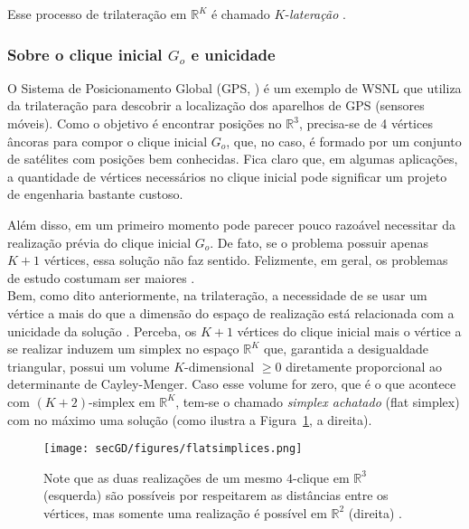 Esse processo de trilateração em $\mathbb{R}^K$ é chamado $K$-\textit{lateração} \cite{eren2004rigidity, libertiEDG}.

\subsubsection{Sobre o clique inicial $G_o$ e unicidade \label{sec:go}}
O Sistema de Posicionamento Global (GPS,  \cite{gps}) é um exemplo de WSNL que utiliza da trilateração para descobrir a localização dos aparelhos de GPS (sensores móveis). Como o objetivo é encontrar posições no $\mathbb{R}^3$, precisa-se de 4 vértices âncoras para compor o clique inicial $G_o$, que, no caso, é formado por um conjunto de satélites com posições bem conhecidas. Fica claro que, em algumas aplicações, a quantidade de vértices necessários no clique inicial pode significar um projeto de engenharia bastante custoso.

Além disso, em um primeiro momento pode parecer pouco razoável necessitar da realização prévia do clique inicial $G_o$. De fato, se o problema possuir apenas $K+1$ vértices, essa solução não faz sentido. Felizmente, em geral, os problemas de estudo costumam ser maiores \cite{carlileGDandAplications}. 
\\

Bem, como dito anteriormente, na trilateração, a necessidade de se usar um vértice a mais do que a dimensão do espaço de realização está relacionada com a unicidade da solução \cite{hendrickson1992conditions, connelly1991generic}. Perceba, os $K+1$ vértices do clique inicial mais o vértice a se realizar induzem um simplex no espaço $\mathbb{R}^K$ que, garantida a desigualdade triangular, possui um volume $K$-dimensional $\geq 0$ diretamente proporcional ao determinante de Cayley-Menger. Caso esse volume for zero, que é o que acontece com $(K+2)$-simplex em $\mathbb{R}^K$, tem-se o chamado \textit{simplex achatado} (flat simplex) com no máximo uma solução \cite{libertiEDG} (como ilustra a Figura~\ref{fig:flatsimplices}, a direita).

\begin{figure}[H]
	\begin{center}
		\texttt{[image: secGD/figures/flatsimplices.png]}
	\end{center}
	\caption{Note que as duas realizações de um mesmo $4$-clique em $\mathbb{R}^3$ (esquerda) são possíveis por respeitarem as distâncias entre os vértices, mas somente uma realização é possível em $\mathbb{R}^{2}$ (direita) \cite{libertiEDG}.}
	\label{fig:flatsimplices}
\end{figure}

